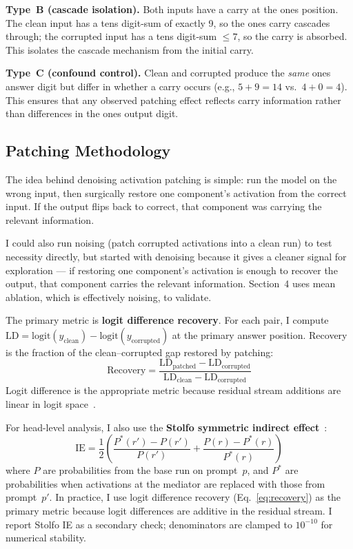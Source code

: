 \documentclass{article}
\begin{document}
\textbf{Type~B (cascade isolation).}
Both inputs have a carry at the ones position.
The clean input has a tens digit-sum of exactly 9, so the ones carry cascades through; the corrupted input has a tens digit-sum $\leq 7$, so the carry is absorbed.
This isolates the cascade mechanism from the initial carry.

\textbf{Type~C (confound control).}
Clean and corrupted produce the \emph{same} ones answer digit but differ in whether a carry occurs (e.g., $5+9=14$ vs.\ $4+0=4$).
This ensures that any observed patching effect reflects carry information rather than differences in the ones output digit.

\subsection{Patching Methodology}

The idea behind denoising activation patching is simple: run the model on the wrong input, then surgically restore one component's activation from the correct input. If the output flips back to correct, that component was carrying the relevant information.

I could also run noising (patch corrupted activations into a clean run) to test necessity directly, but started with denoising because it gives a cleaner signal for exploration --- if restoring one component's activation is enough to recover the output, that component carries the relevant information. Section~4 uses mean ablation, which is effectively noising, to validate.

The primary metric is \textbf{logit difference recovery}.
For each pair, I compute $\text{LD} = \text{logit}(y_\text{clean}) - \text{logit}(y_\text{corrupted})$ at the primary answer position.
Recovery is the fraction of the clean--corrupted gap restored by patching:
\begin{equation}
\text{Recovery} = \frac{\text{LD}_\text{patched} - \text{LD}_\text{corrupted}}{\text{LD}_\text{clean} - \text{LD}_\text{corrupted}}
\label{eq:recovery}
\end{equation}
Logit difference is the appropriate metric because residual stream additions are linear in logit space~\cite{zhang2024best}.

For head-level analysis, I also use the \textbf{Stolfo symmetric indirect effect}~\cite{stolfo2023mechanistic}:
\begin{equation}
\text{IE} = \frac{1}{2}\!\left(\frac{P^*(r') - P(r')}{P(r')} + \frac{P(r) - P^*(r)}{P^*(r)}\right)
\label{eq:ie}
\end{equation}
where $P$ are probabilities from the base run on prompt~$p$, and $P^*$ are probabilities when activations at the mediator are replaced with those from prompt~$p'$.
In practice, I use logit difference recovery (Eq.~\ref{eq:recovery}) as the primary metric because logit differences are additive in the residual stream.
I report Stolfo IE as a secondary check; denominators are clamped to $10^{-10}$ for numerical stability.
\end{document}
